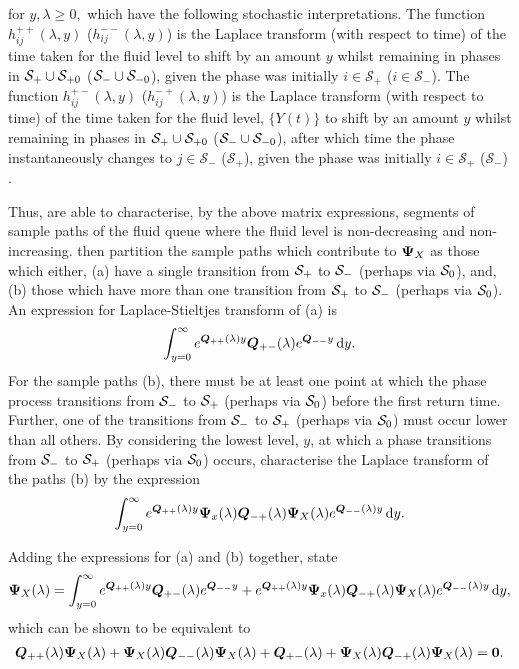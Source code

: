 for \(y,\lambda\geq 0,\) which have the following stochastic interpretations. The function \(h_{ij}^{++}(\lambda,y)\) (\(h_{ij}^{--}(\lambda,y)\)) is the Laplace transform (with respect to time) of the time taken for the fluid level to shift by an amount \(y\) whilst remaining in phases in \(\mathcal S_+\cup\mathcal{S}_{+0}\) (\(\mathcal S_-\cup\mathcal{S}_{-0}\)), given the phase was initially \(i\in\mathcal S_+\) (\(i\in\mathcal S_-\)). The function \(h_{ij}^{+-}(\lambda,y)\) (\(h_{ij}^{-+}(\lambda,y)\)) is the Laplace transform (with respect to time) of the time taken for the fluid level, \(\{Y(t)\}\) to shift by an amount \(y\) whilst remaining in phases in \(\mathcal S_+\cup\mathcal{S}_{+0}\) (\(\mathcal S_-\cup\mathcal{S}_{-0}\)), after which time the phase instantaneously changes to \(j\in\mathcal S_-\) (\(\mathcal S_+\)), given the phase was initially \(i\in\mathcal S_+\) (\(\mathcal S_-\)) \citep{bean2005}.

Thus, \cite{bean2005} are able to characterise, by the above matrix expressions, segments of sample paths of the fluid queue where the fluid level is non-decreasing and non-increasing. \cite{bean2005} then partition the sample paths which contribute to \(\boldsymbol \Psi_X\) as those which either, (a) have a single transition from \(\mathcal{S}_+\) to \(\mathcal{S}_-\) (perhaps via \(\mathcal{S}_0\)), and, (b) those which have more than one transition from \(\mathcal{S}_+\) to \(\mathcal{S}_-\) (perhaps via \(\mathcal{S}_0\)). An expression for Laplace-Stieltjes transform of (a) is 
\[\int_{y=0}^\infty e^{\boldsymbol Q_{++}(\lambda)y}\boldsymbol Q_{+-}(\lambda)e^{\boldsymbol Q_{--}y}\, \mathrm{d} y.\]
For the sample paths (b), there must be at least one point at which the phase process transitions from \(\mathcal{S}_-\) to \(\mathcal{S}_+\) (perhaps via \(\mathcal{S}_0\)) before the first return time. Further, one of the transitions from \(\mathcal{S}_-\) to \(\mathcal{S}_+\) (perhaps via \(\mathcal{S}_0\)) must occur lower than all others. By considering the lowest level, \(y\), at which a phase transitions from \(\mathcal{S}_-\) to \(\mathcal{S}_+\) (perhaps via \(\mathcal{S}_0\)) occurs, \cite{bean2005} characterise the Laplace transform of the paths (b) by the expression 
\begin{align}
	\int_{y=0}^\infty e^{\boldsymbol Q_{++}(\lambda)y} \boldsymbol \Psi_x(\lambda)\boldsymbol Q_{-+}(\lambda)\boldsymbol \Psi_X(\lambda) e^{\boldsymbol Q_{--}(\lambda)y}\, \mathrm{d} y.
\end{align}

Adding the expressions for (a) and (b) together, \cite{bean2005} state 
\begin{align}
	\boldsymbol \Psi_X(\lambda) = \int_{y=0}^\infty e^{\boldsymbol Q_{++}(\lambda)y}\boldsymbol Q_{+-}(\lambda)e^{\boldsymbol Q_{--}y} + e^{\boldsymbol Q_{++}(\lambda)y} \boldsymbol \Psi_x(\lambda)\boldsymbol Q_{-+}(\lambda)\boldsymbol \Psi_X(\lambda) e^{\boldsymbol Q_{--}(\lambda)y}\, \mathrm{d} y,
\end{align}
which can be shown to be equivalent to \citep[Lemma~3 and Theorem~9.2]{br1997}
\begin{align}
	\boldsymbol Q_{++}(\lambda)\boldsymbol \Psi_X(\lambda) + \boldsymbol \Psi_X(\lambda)\boldsymbol Q_{--}(\lambda)\boldsymbol \Psi_X(\lambda) + \boldsymbol Q_{+-}(\lambda) + \boldsymbol \Psi_X(\lambda)\boldsymbol Q_{-+}(\lambda)\boldsymbol \Psi_X(\lambda) = \boldsymbol 0.
\end{align}

